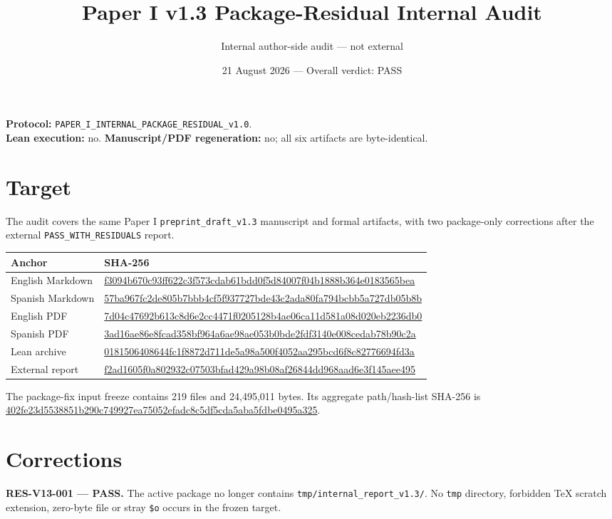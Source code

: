\documentclass[11pt]{article}
\title{Paper I v1.3 Package-Residual Internal Audit}
\author{Internal author-side audit --- not external}
\date{21 August 2026 --- Overall verdict: PASS}
\begin{document}
\maketitle
\textbf{Protocol:} \texttt{PAPER\_I\_INTERNAL\_PACKAGE\_RESIDUAL\_v1.0}.\\
\textbf{Lean execution:} no.\quad
\textbf{Manuscript/PDF regeneration:} no; all six artifacts are byte-identical.

\section{Target}
The audit covers the same Paper I \texttt{preprint\_draft\_v1.3} manuscript
and formal artifacts, with two package-only corrections after the external
\texttt{PASS\_WITH\_RESIDUALS} report.

\small
\begin{longtable}{p{.25\linewidth}p{.67\linewidth}}
\toprule Anchor & SHA-256 \\ \midrule
English Markdown & \url{f3094b670c93ff622c3f573cdab61bdd0f5d84007f04b1888b364e0183565bea} \\
Spanish Markdown & \url{57ba967fc2de805b7bbb4cf5f937727bde43c2ada80fa794bcbb5a727db05b8b} \\
English PDF & \url{7d04c47692b613c8d6e2cc4471f0205128b4ae06ca11d581a08d020eb2236db0} \\
Spanish PDF & \url{3ad16ae86e8fcad358bf964a6ae98ae053b0bde2fdf3140e008cedab78b90c2a} \\
Lean archive & \url{0181506408644fc1f8872d711de5a98a500f4052aa295bcd6f8c82776694fd3a} \\
External report & \url{f2ad1605f0a802932c07503bfad429a98b08af26844dd968aad6e3f145aee495} \\
\bottomrule
\end{longtable}
\normalsize

The package-fix input freeze contains 219 files and 24,495,011 bytes. Its
aggregate path/hash-list SHA-256 is
\url{402fe23d5538851b290c749927ea75052efadc8c5df5cda5aba5fdbe0495a325}.

\section{Corrections}
\textbf{RES-V13-001 --- PASS.} The active package no longer contains
\texttt{tmp/internal\_report\_v1.3/}. No \texttt{tmp} directory, forbidden
TeX scratch extension, zero-byte file or stray \texttt{\$o} occurs in the
frozen target.
\end{document}
